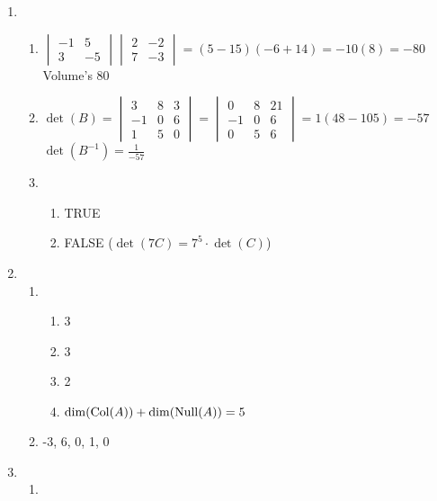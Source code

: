 \documentclass[leqno]{article}
\begin{document}
\begin{enumerate}
    \item \begin{enumerate}
        \item $\begin{vmatrix}-1 & 5 \\ 3 & -5\end{vmatrix}\begin{vmatrix}2 & -2 \\ 7 & -3\end{vmatrix} = (5 - 15)(-6 + 14) = -10(8) = -80$\\
        Volume's 80
        \item $\det(B) = \begin{vmatrix}
        3 & 8 & 3 \\
        -1 & 0 & 6 \\
        1 & 5 & 0
        \end{vmatrix} = \begin{vmatrix}
        0 & 8 & 21 \\
        -1 & 0 & 6 \\
        0 & 5 & 6
        \end{vmatrix} = 1(48 - 105) = -57$\\
        $\displaystyle \det(B^{-1}) = \frac 1 {-57}$
        \item \begin{enumerate}
            \item TRUE
            \item FALSE ($\det(7C) = 7^5 \cdot \det(C)$)
        \end{enumerate}
    \end{enumerate}
    \item \begin{enumerate}
        \item
        \begin{enumerate}
            \item 3
            \item 3
            \item 2
            \item $\dim(\operatorname{Col}(A)) + \dim(\operatorname{Null}(A)) = 5$
        \end{enumerate}
        \item -3, 6, 0, 1, 0
    \end{enumerate}
    \item \begin{enumerate}
        \item \begin{enumerate}

\end{enumerate}
\end{enumerate}
\end{enumerate}
\end{document}
